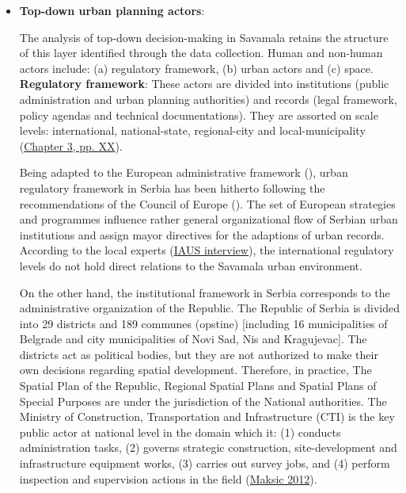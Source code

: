 \documentclass[11pt]{report}
\begin{document}
\begin{itemize}
\item \textbf{Top-down urban planning actors}:

The analysis of top-down decision-making in Savamala retains the structure of this layer identified through the data collection.
Human and non-human actors include:
(a) regulatory framework,
(b) urban actors
and
(c) space.
\\

\textbf{Regulatory framework}: 
These actors are divided into institutions (public administration and urban planning authorities) and records (legal framework, policy agendas and technical documentations).
They are assorted on scale levels: international, national-state, regional-city and local-municipality (\href{}{Chapter 3, pp. XX}). 

Being adapted to the European administrative framework (\cite{Official gazette RS 09/2014}), urban regulatory framework in Serbia has been hitherto following the recommendations of the Council of Europe
(\cite{Urbani razvoj u Srbiji Ministry of Space 2014}). The set of European strategies and programmes influence rather general organizational flow of Serbian urban institutions and assign mayor directives for the adaptions of urban records.
According to the local experts
(\href{}{IAUS interview}), the international regulatory levels do not hold direct relations to the Savamala urban environment.

On the other hand, the institutional framework in Serbia corresponds to the administrative organization of the Republic.
The Republic of Serbia is divided into 29 districts and 189 communes (opstine) [including 16 municipalities of Belgrade and city municipalities of Novi Sad, Nis and Kragujevac].
The districts act as political bodies, but they are not authorized to make their own decisions regarding spatial development.
Therefore, in practice, The Spatial Plan of the Republic, Regional Spatial Plans and Spatial Plans of Special Purposes are under the jurisdiction of the National authorities. 
The Ministry of Construction, Transportation and Infrastructure (CTI) is the key public actor at national level in the domain which it:
(1) conducts administration tasks,
(2) governs strategic construction, site-development and infrastructure equipment works,
(3) carries out survey jobs,
and
(4) perform inspection and supervision actions in the field (\href{}{Maksic 2012}).


\end{itemize}
\end{document}

